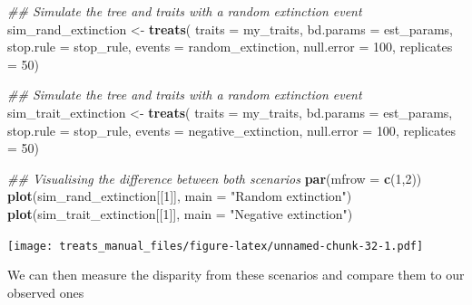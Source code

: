 \documentclass[
]{book}
\newenvironment{Shaded}{\begin{snugshade}}{\end{snugshade}}
\newcommand{\CommentTok}[1]{\textcolor[rgb]{0.56,0.35,0.01}{\textit{#1}}}
\newcommand{\DataTypeTok}[1]{\textcolor[rgb]{0.13,0.29,0.53}{#1}}
\newcommand{\DecValTok}[1]{\textcolor[rgb]{0.00,0.00,0.81}{#1}}
\newcommand{\KeywordTok}[1]{\textcolor[rgb]{0.13,0.29,0.53}{\textbf{#1}}}
\newcommand{\NormalTok}[1]{#1}
\newcommand{\StringTok}[1]{\textcolor[rgb]{0.31,0.60,0.02}{#1}}
\begin{document}
\begin{Shaded}
\begin{Highlighting}[]
\CommentTok{\#\# Simulate the tree and traits with a random extinction event}
\NormalTok{sim\_rand\_extinction \textless{}{-}}\StringTok{ }\KeywordTok{treats}\NormalTok{(}
                   \DataTypeTok{traits     =}\NormalTok{ my\_traits,}
                   \DataTypeTok{bd.params  =}\NormalTok{ est\_params,}
                   \DataTypeTok{stop.rule  =}\NormalTok{ stop\_rule,}
                   \DataTypeTok{events     =}\NormalTok{ random\_extinction,}
                   \DataTypeTok{null.error =} \DecValTok{100}\NormalTok{,}
                   \DataTypeTok{replicates =} \DecValTok{50}\NormalTok{)}

\CommentTok{\#\# Simulate the tree and traits with a random extinction event}
\NormalTok{sim\_trait\_extinction \textless{}{-}}\StringTok{ }\KeywordTok{treats}\NormalTok{(}
                   \DataTypeTok{traits     =}\NormalTok{ my\_traits,}
                   \DataTypeTok{bd.params  =}\NormalTok{ est\_params,}
                   \DataTypeTok{stop.rule  =}\NormalTok{ stop\_rule,}
                   \DataTypeTok{events     =}\NormalTok{ negative\_extinction,}
                   \DataTypeTok{null.error =} \DecValTok{100}\NormalTok{,}
                   \DataTypeTok{replicates =} \DecValTok{50}\NormalTok{)}

\CommentTok{\#\# Visualising the difference between both scenarios}
\KeywordTok{par}\NormalTok{(}\DataTypeTok{mfrow =} \KeywordTok{c}\NormalTok{(}\DecValTok{1}\NormalTok{,}\DecValTok{2}\NormalTok{))}
\KeywordTok{plot}\NormalTok{(sim\_rand\_extinction[[}\DecValTok{1}\NormalTok{]], }\DataTypeTok{main =} \StringTok{"Random extinction"}\NormalTok{)}
\KeywordTok{plot}\NormalTok{(sim\_trait\_extinction[[}\DecValTok{1}\NormalTok{]], }\DataTypeTok{main =} \StringTok{"Negative extinction"}\NormalTok{)}
\end{Highlighting}
\end{Shaded}

\texttt{[image: treats\_manual\_files/figure-latex/unnamed-chunk-32-1.pdf]}

We can then measure the disparity from these scenarios and compare them to our observed ones
\end{document}
